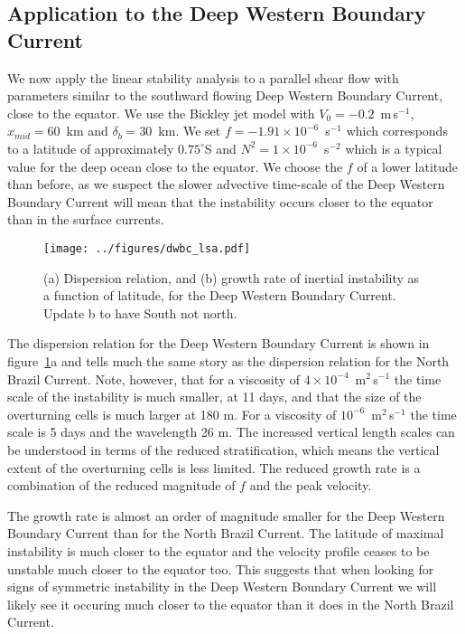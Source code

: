 \subsection{Application to the Deep Western Boundary Current}
We now apply the linear stability analysis to a parallel shear flow with parameters similar to the southward flowing Deep Western Boundary Current, close to the equator. We use the Bickley jet model with $V_0 = - 0.2$~m$\,$s$^{-1}$, $x_{mid} = 60$~km and $\delta_b = 30$~km. We set $f = - 1.91 \times 10^{-6}$~s$^{-1}$ which corresponds to a latitude of approximately $0.75^\circ$S and $N^2 = 1 \times 10^{-6}$~s$^{-2}$ which is a typical value for the deep ocean close to the equator. We choose the $f$ of a lower latitude than before, as we suspect the slower advective time-scale of the Deep Western Boundary Current will mean that the instability occurs closer to the equator than in the surface currents.
\begin{figure}
    \centering
    \texttt{[image: ../figures/dwbc\_lsa.pdf]}
    \caption{(a) Dispersion relation, and (b) growth rate of inertial instability as a function of latitude, for the Deep Western Boundary Current. Update b to have South not north.}
    \label{fig:lsaDWBC}
\end{figure}

The dispersion relation for the Deep Western Boundary Current is shown in figure~\ref{fig:lsaDWBC}a and tells much the same story as the dispersion relation for the North Brazil Current. Note, however, that for a viscosity of $4 \times 10^{-4}$~m$^2\,$s$^{-1}$ the time scale of the instability is much smaller, at 11 days, and that the size of the overturning cells is much larger at 180 m. For a viscosity of $10^{-6}$~m$^2\,$s$^{-1}$ the time scale is 5 days and the wavelength 26 m. The increased vertical length scales can be understood in terms of the reduced stratification, which means the vertical extent of the overturning cells is less limited. The reduced growth rate is a combination of the reduced magnitude of $f$ and the peak velocity.

The growth rate is almost an order of magnitude smaller for the Deep Western Boundary Current than for the North Brazil Current. The latitude of maximal instability is much closer to the equator and the velocity profile ceases to be unstable much closer to the equator too. This suggests that when looking for signs of symmetric instability in the Deep Western Boundary Current we will likely see it occuring much closer to the equator than it does in the North Brazil Current.

